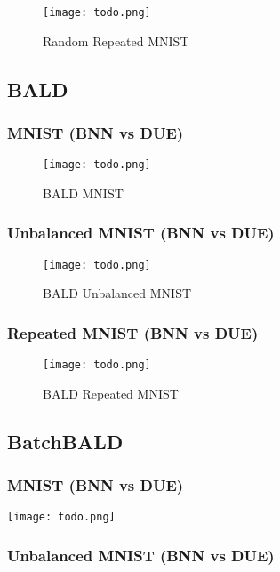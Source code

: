 \documentclass[12pt, a4paper]{report}
\theoremstyle{definition}
\theoremstyle{definition}
\theoremstyle{definition}
\begin{document}
\begin{figure}[H]
\centering
\texttt{[image: todo.png]}
\caption{Random Repeated MNIST}
\end{figure}

\subsection{BALD}

\subsubsection{MNIST (BNN vs DUE)}

\begin{figure}[H]
\centering
\texttt{[image: todo.png]}
\caption{BALD MNIST}
\end{figure}

\subsubsection{Unbalanced MNIST (BNN vs DUE)}

\begin{figure}[H]
\centering
\texttt{[image: todo.png]}
\caption{BALD Unbalanced MNIST}
\end{figure}

\subsubsection{Repeated MNIST (BNN vs DUE)}

\begin{figure}[H]
\centering
\texttt{[image: todo.png]}
\caption{BALD Repeated MNIST}
\end{figure}
    

\subsection{BatchBALD}

\subsubsection{MNIST (BNN vs DUE)}

\texttt{[image: todo.png]}

\subsubsection{Unbalanced MNIST (BNN vs DUE)}
\end{document}
